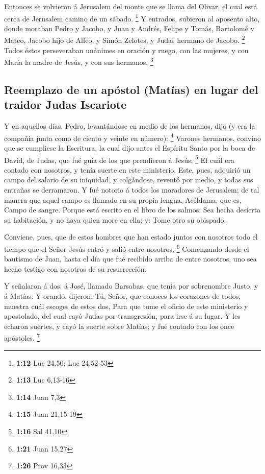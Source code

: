  Entonces se volvieron á Jerusalem del monte que se llama
del Olivar, el cual está cerca de Jerusalem camino de un sábado.
\footnote{\textbf{1:12} Luc 24,50; Luc 24,52-53}  Y
entrados, subieron al aposento alto, donde moraban Pedro y Jacobo, y
Juan y Andrés, Felipe y Tomás, Bartolomé y Mateo, Jacobo hijo de Alfeo,
y Simón Zelotes, y Judas hermano de Jacobo. \footnote{\textbf{1:13} Luc
  6,13-16}  Todos éstos perseveraban unánimes en oración
y ruego, con las mujeres, y con María la madre de Jesús, y con sus
hermanos. \footnote{\textbf{1:14} Juan 7,3}

\hypertarget{reemplazo-de-un-apuxf3stol-matuxedas-en-lugar-del-traidor-judas-iscariote}{%
\subsection{Reemplazo de un apóstol (Matías) en lugar del traidor Judas
Iscariote}\label{reemplazo-de-un-apuxf3stol-matuxedas-en-lugar-del-traidor-judas-iscariote}}

 Y en aquellos días, Pedro, levantándose en medio de los
hermanos, dijo (y era la compañía junta como de ciento y veinte en
número): \footnote{\textbf{1:15} Juan 21,15-19}  Varones
hermanos, convino que se cumpliese la Escritura, la cual dijo antes el
Espíritu Santo por la boca de David, de Judas, que fué guía de los que
prendieron á Jesús; \footnote{\textbf{1:16} Sal 41,10} 
El cuál era contado con nosotros, y tenía suerte en este ministerio.
 Este, pues, adquirió un campo del salario de su
iniquidad, y colgándose, reventó por medio, y todas sus entrañas se
derramaron.  Y fué notorio á todos los moradores de
Jerusalem; de tal manera que aquel campo es llamado en su propia lengua,
Acéldama, que es, Campo de sangre.  Porque está escrito
en el libro de los salmos: Sea hecha desierta su habitación, y no haya
quien more en ella; y: Tome otro su obispado.

 Conviene, pues, que de estos hombres que han estado
juntos con nosotros todo el tiempo que el Señor Jesús entró y salió
entre nosotros, \footnote{\textbf{1:21} Juan 15,27} 
Comenzando desde el bautismo de Juan, hasta el día que fué recibido
arriba de entre nosotros, uno sea hecho testigo con nosotros de su
resurrección.

 Y señalaron á dos: á José, llamado Barsabas, que tenía
por sobrenombre Justo, y á Matías.  Y orando, dijeron:
Tú, Señor, que conoces los corazones de todos, muestra cuál escoges de
estos dos,  Para que tome el oficio de este ministerio y
apostolado, del cual cayó Judas por transgresión, para irse á su lugar.
 Y les echaron suertes, y cayó la suerte sobre Matías; y
fué contado con los once apóstoles. \footnote{\textbf{1:26} Prov 16,33}

